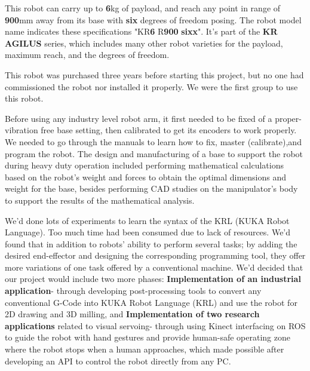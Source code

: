 This robot can carry up to \textbf{6}kg of payload, and reach any point in range of \textbf{900}mm away from its base with \textbf{six} degrees of freedom posing. The robot model name indicates these specifications "KR\textbf{6} R\textbf{900} \textbf{sixx}". It's part of the \textbf{KR AGILUS} series, which includes many other robot varieties for the payload, maximum reach, and the degrees of freedom. 

This robot was purchased three years before starting this project, but no one had commissioned the robot nor installed it properly. We were the first group to use this robot.
 
Before using any industry level robot arm, it first needed to be fixed of a proper- vibration free base setting, then calibrated to get its encoders to work properly. We needed to go through the manuals to learn how to fix, master (calibrate),and program the robot. The design and manufacturing of a base to support the robot during heavy duty operation included performing mathematical calculations based on the robot’s weight and forces to obtain the optimal dimensions and weight for the base, besides performing CAD studies on the manipulator’s body to support the results of the mathematical analysis.

We'd done lots of experiments to learn the syntax of the KRL (KUKA Robot Language). Too much time had been consumed due to lack of resources. We'd found that in addition to robots’ ability to perform several tasks; by adding the desired end-effector and designing the corresponding programming tool, they offer more variations of one task offered by a conventional machine. We'd decided that our project would include two more phases:  \textbf{Implementation of an industrial application}- through developing post-processing tools to convert any conventional G-Code into KUKA Robot Language (KRL) and use the robot for 2D drawing and 3D milling, and \textbf{ Implementation of two research applications} related to visual servoing- through using Kinect interfacing on ROS to guide the robot with hand gestures and provide human-safe operating zone where the robot stops when a human approaches, which made possible after developing an API to control the robot directly from any PC.	
 
	
